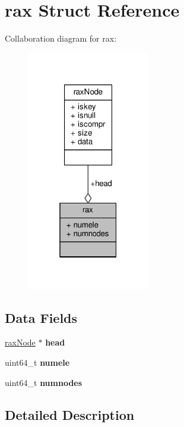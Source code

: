 \hypertarget{structrax}{}\section{rax Struct Reference}
\label{structrax}


Collaboration diagram for rax\+:\nopagebreak
\begin{figure}[H]
\begin{center}
\leavevmode
\includegraphics[width=151pt]{structrax__coll__graph}
\end{center}
\end{figure}
\subsection*{Data Fields}
\begin{DoxyCompactItemize}
\item 
\mbox{\label{structrax_a9cca71d1469d2227b34f4c59103dd8ac}} 
\hyperlink{structraxNode}{rax\+Node} $\ast$ {\bfseries head}
\item 
\mbox{\label{structrax_a46ab6cb87a05fa43ebe5b70e01198d66}} 
uint64\+\_\+t {\bfseries numele}
\item 
\mbox{\label{structrax_a2ae9278812b9f5df9e689ef38a934861}} 
uint64\+\_\+t {\bfseries numnodes}
\end{DoxyCompactItemize}


\subsection{Detailed Description}


